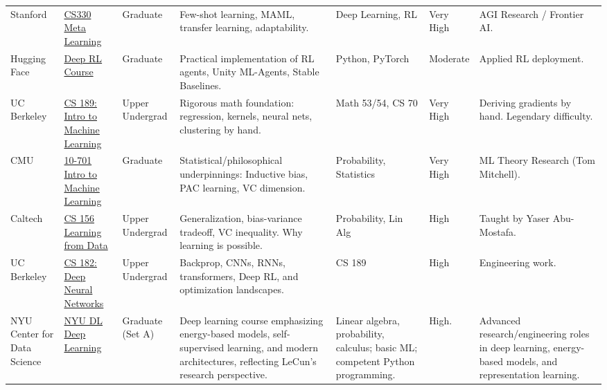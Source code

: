 \documentclass[10pt, a4paper, landscape]{article}
\begin{document}
\begin{longtable}{L{2cm} L{3.5cm} L{1.8cm} L{6cm} L{3.5cm} L{2cm} L{5cm}}
    \addlinespace
    \addlinespace
    Stanford & \href{https://online.stanford.edu/courses/cs330-deep-multi-task-and-meta-learning}{CS330 Meta Learning} & Graduate & Few-shot learning, MAML, transfer learning, adaptability. & Deep Learning, RL & Very High & AGI Research / Frontier AI. \\
    \addlinespace
    \addlinespace
    Hugging Face & \href{https://huggingface.co/learn/deep-rl-course/unit0/introduction}{Deep RL Course} & Graduate & Practical implementation of RL agents, Unity ML-Agents, Stable Baselines. & Python, PyTorch & Moderate & Applied RL deployment. \\
    \addlinespace
    UC Berkeley & \href{https://people.eecs.berkeley.edu/~jrs/189/}{CS 189: Intro to Machine Learning} & Upper Undergrad & Rigorous math foundation: regression, kernels, neural nets, clustering by hand. & Math 53/54, CS 70 & Very High & Deriving gradients by hand. Legendary difficulty. \\
    \addlinespace
    CMU & \href{https://www.cs.cmu.edu/~tom/10701_sp11/}{10-701 Intro to Machine Learning} & Graduate & Statistical/philosophical underpinnings: Inductive bias, PAC learning, VC dimension. & Probability, Statistics & Very High & ML Theory Research (Tom Mitchell). \\
    \addlinespace
    Caltech & \href{https://work.caltech.edu/telecourse}{CS 156 Learning from Data} & Upper Undergrad & Generalization, bias-variance tradeoff, VC inequality. Why learning is possible. & Probability, Lin Alg & High & Taught by Yaser Abu-Mostafa. \\
    \addlinespace
    UC Berkeley & \href{https://inst.eecs.berkeley.edu/~cs182/}{CS 182: Deep Neural Networks} & Upper Undergrad & Backprop, CNNs, RNNs, transformers, Deep RL, and optimization landscapes. & CS 189 & High & Engineering work. \\
    \addlinespace
    \addlinespace
    NYU Center for Data Science & \href{https://atcold.github.io/NYU-DLSP21/}{NYU DL Deep Learning} & Graduate (Set A) & Deep learning course emphasizing energy-based models, self-supervised learning, and modern architectures, reflecting LeCun’s research perspective. & Linear algebra, probability, calculus; basic ML; competent Python programming. & High. & Advanced research/engineering roles in deep learning, energy-based models, and representation learning. \\


\end{longtable}
\end{document}
